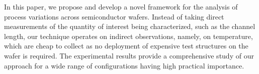In this paper, we propose and develop a novel framework for the analysis of process variations across semiconductor wafers. Instead of taking direct measurements of the quantity of interest being characterized, such as the channel length, our technique operates on indirect observations, namely, on temperature, which are cheap to collect as no deployment of expensive test structures on the wafer is required.
The experimental results provide a comprehensive study of our approach for a wide range of configurations having high practical importance.
